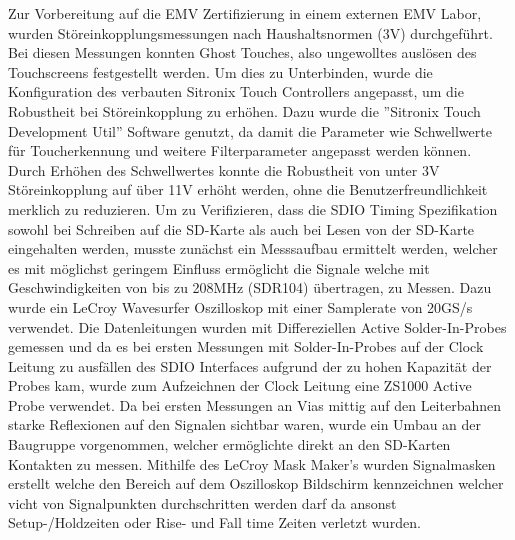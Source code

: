 \documentclass[praktikum,german]{hgbthesis}
\begin{document}
Zur Vorbereitung auf die EMV Zertifizierung in einem externen EMV Labor, wurden Störeinkopplungsmessungen nach Haushaltsnormen (3V) durchgeführt. Bei diesen Messungen konnten Ghost Touches, also ungewolltes auslösen des Touchscreens festgestellt werden. Um dies zu Unterbinden, wurde die Konfiguration des verbauten Sitronix Touch Controllers angepasst, um die Robustheit bei Störeinkopplung zu erhöhen. Dazu wurde die ''Sitronix Touch Development Util'' Software genutzt, da damit die Parameter wie Schwellwerte für Toucherkennung und weitere Filterparameter angepasst werden können. Durch Erhöhen des Schwellwertes konnte die Robustheit von unter 3V Störeinkopplung auf über 11V erhöht werden, ohne die Benutzerfreundlichkeit merklich zu reduzieren.
Um zu Verifizieren, dass die SDIO Timing Spezifikation sowohl bei Schreiben auf die SD-Karte als auch bei Lesen von der SD-Karte eingehalten werden, musste zunächst ein Messsaufbau ermittelt werden, welcher es mit möglichst geringem Einfluss ermöglicht die Signale welche mit Geschwindigkeiten von bis zu 208MHz (SDR104) übertragen, zu Messen. Dazu wurde ein LeCroy Wavesurfer Oszilloskop mit einer Samplerate von 20GS/s verwendet. Die Datenleitungen wurden mit Differeziellen Active Solder-In-Probes gemessen und da es bei ersten Messungen mit Solder-In-Probes auf der Clock Leitung zu ausfällen des SDIO Interfaces aufgrund der zu hohen Kapazität der Probes kam, wurde zum Aufzeichnen der Clock Leitung eine ZS1000 Active Probe verwendet. Da bei ersten Messungen an Vias mittig auf den Leiterbahnen starke Reflexionen auf den Signalen sichtbar waren, wurde ein Umbau an der Baugruppe vorgenommen, welcher ermöglichte direkt an den SD-Karten Kontakten zu messen.
Mithilfe des LeCroy Mask Maker's wurden Signalmasken erstellt welche den Bereich auf dem Oszilloskop Bildschirm kennzeichnen welcher vicht von Signalpunkten durchschritten werden darf da ansonst Setup-/Holdzeiten oder Rise- und Fall time Zeiten verletzt wurden.
\end{document}
